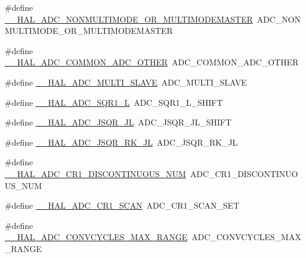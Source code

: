 \begin{DoxyCompactItemize}
\item 
\#define \hyperlink{group___h_a_l___a_d_c___aliased___macros_ga3dceabcf80e81b5a911bbe5ad3ff311a}{\+\_\+\+\_\+\+H\+A\+L\+\_\+\+A\+D\+C\+\_\+\+N\+O\+N\+M\+U\+L\+T\+I\+M\+O\+D\+E\+\_\+\+O\+R\+\_\+\+M\+U\+L\+T\+I\+M\+O\+D\+E\+M\+A\+S\+T\+ER}~A\+D\+C\+\_\+\+N\+O\+N\+M\+U\+L\+T\+I\+M\+O\+D\+E\+\_\+\+O\+R\+\_\+\+M\+U\+L\+T\+I\+M\+O\+D\+E\+M\+A\+S\+T\+ER
\item 
\#define \hyperlink{group___h_a_l___a_d_c___aliased___macros_gafa9bcc01aa0b2a887721e8971031ad0b}{\+\_\+\+\_\+\+H\+A\+L\+\_\+\+A\+D\+C\+\_\+\+C\+O\+M\+M\+O\+N\+\_\+\+A\+D\+C\+\_\+\+O\+T\+H\+ER}~A\+D\+C\+\_\+\+C\+O\+M\+M\+O\+N\+\_\+\+A\+D\+C\+\_\+\+O\+T\+H\+ER
\item 
\#define \hyperlink{group___h_a_l___a_d_c___aliased___macros_gaeff1a570027a91c87a339fd79704c3d2}{\+\_\+\+\_\+\+H\+A\+L\+\_\+\+A\+D\+C\+\_\+\+M\+U\+L\+T\+I\+\_\+\+S\+L\+A\+VE}~A\+D\+C\+\_\+\+M\+U\+L\+T\+I\+\_\+\+S\+L\+A\+VE
\item 
\#define \hyperlink{group___h_a_l___a_d_c___aliased___macros_ga27072f37b7d50adad434a681331755f0}{\+\_\+\+\_\+\+H\+A\+L\+\_\+\+A\+D\+C\+\_\+\+S\+Q\+R1\+\_\+L}~A\+D\+C\+\_\+\+S\+Q\+R1\+\_\+\+L\+\_\+\+S\+H\+I\+FT
\item 
\#define \hyperlink{group___h_a_l___a_d_c___aliased___macros_ga8764a28e2bb7d6a859fc52074e2ec1ec}{\+\_\+\+\_\+\+H\+A\+L\+\_\+\+A\+D\+C\+\_\+\+J\+S\+Q\+R\+\_\+\+JL}~A\+D\+C\+\_\+\+J\+S\+Q\+R\+\_\+\+J\+L\+\_\+\+S\+H\+I\+FT
\item 
\#define \hyperlink{group___h_a_l___a_d_c___aliased___macros_ga51b8c1d68c48edfa958f988845d2ea41}{\+\_\+\+\_\+\+H\+A\+L\+\_\+\+A\+D\+C\+\_\+\+J\+S\+Q\+R\+\_\+\+R\+K\+\_\+\+JL}~A\+D\+C\+\_\+\+J\+S\+Q\+R\+\_\+\+R\+K\+\_\+\+JL
\item 
\#define \hyperlink{group___h_a_l___a_d_c___aliased___macros_gab00342d0ece8deb8900df22b5193377e}{\+\_\+\+\_\+\+H\+A\+L\+\_\+\+A\+D\+C\+\_\+\+C\+R1\+\_\+\+D\+I\+S\+C\+O\+N\+T\+I\+N\+U\+O\+U\+S\+\_\+\+N\+UM}~A\+D\+C\+\_\+\+C\+R1\+\_\+\+D\+I\+S\+C\+O\+N\+T\+I\+N\+U\+O\+U\+S\+\_\+\+N\+UM
\item 
\#define \hyperlink{group___h_a_l___a_d_c___aliased___macros_gae645d58040b162666fa506aeb3728f49}{\+\_\+\+\_\+\+H\+A\+L\+\_\+\+A\+D\+C\+\_\+\+C\+R1\+\_\+\+S\+C\+AN}~A\+D\+C\+\_\+\+C\+R1\+\_\+\+S\+C\+A\+N\+\_\+\+S\+ET
\item 
\#define \hyperlink{group___h_a_l___a_d_c___aliased___macros_gaffcdf78845300c37812650611d2915b4}{\+\_\+\+\_\+\+H\+A\+L\+\_\+\+A\+D\+C\+\_\+\+C\+O\+N\+V\+C\+Y\+C\+L\+E\+S\+\_\+\+M\+A\+X\+\_\+\+R\+A\+N\+GE}~A\+D\+C\+\_\+\+C\+O\+N\+V\+C\+Y\+C\+L\+E\+S\+\_\+\+M\+A\+X\+\_\+\+R\+A\+N\+GE

\end{DoxyCompactItemize}
